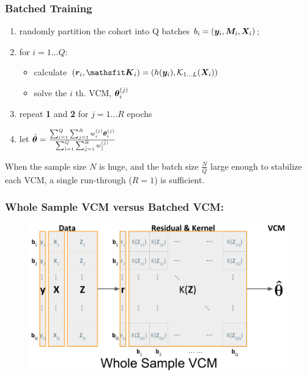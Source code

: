\documentclass{beamer}
\begin{document}
\begin{frame}\frametitle{Batched Training}
  \begin{enumerate}
  \item randomly partition the cohort into Q batches $b_i = ({\bm{y}}_i, {\bm{M}}_i, {\bm{X}}_i)$;
  \item for $i = 1 \dots Q$:
    \begin{itemize}
    \item calculate $(\vr_i, \tK_i) = (h(\vy_i), \mathcal{K}_{1 \dots L}(\mX_i))$
    \item solve the $i$ th. VCM, ${\bm{\theta}}_i^{(j)}$
    \end{itemize}
  \item repeat \textbf{1} and \textbf{2} for $j=1 \dots R$ epochs
  \item let $\hat{{\bm{\theta}}} = \frac
    {\sum_{i=1}^Q\sum_{j=1}^R w_i^{(j)}{\bm{\theta}}_i^{(j)}}
    {\sum_{\tilde{i}=1}^Q \sum_{\tilde{j}=1}^R w_{\tilde{i}}^{(\tilde{j})}}$
  \end{enumerate}
  When the sample size $N$ is huge, and the batch size $\frac{N}{Q}$ large enough to
  stabilize each VCM, a single run-through ($R=1$) is sufficient.
\end{frame}
\begin{frame}\frametitle{Whole Sample VCM versus Batched VCM:} %
  \begin{figure}\includegraphics[width=1\textwidth]{img/vcm_whl}\end{figure}
\end{frame}
\end{document}
